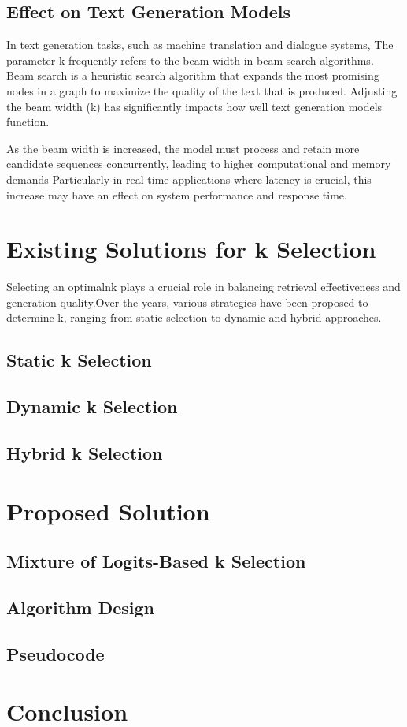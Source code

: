 \subsection {Effect on Text Generation Models}
In text generation tasks, such as machine translation and dialogue systems, The parameter k frequently refers to the beam width in beam search algorithms\cite{freitag-al-onaizan-2017-beam}. Beam search is a heuristic search algorithm that expands the most promising nodes in a graph to maximize the quality of the text that is produced. Adjusting the beam width (k) has significantly impacts how well text generation models function.

As the beam width is increased, the model must process and retain more candidate sequences concurrently, leading to higher computational and memory demands Particularly in real-time applications where latency is crucial, this increase may have an effect on system performance and response time\cite{tensorrt_llm_beam_search}.

\section{Existing Solutions for k Selection}
Selecting an optimalnk plays a crucial role in balancing retrieval effectiveness and generation quality.Over the years, various strategies have been proposed to determine k, ranging from static selection to dynamic and hybrid approaches.
\subsection{Static k Selection}
\subsection{Dynamic k Selection}
\subsection{Hybrid k Selection}
\section{ Proposed Solution}
\subsection{Mixture of Logits-Based k Selection}
\subsection{Algorithm Design}
\subsection{Pseudocode}
\section{ Conclusion }
